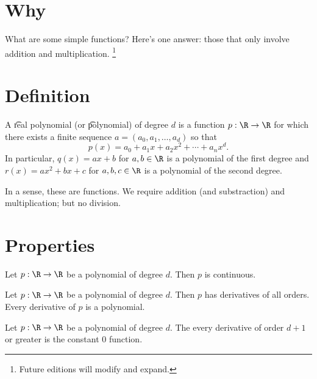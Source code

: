 
\section*{Why}

What are some simple functions?
Here's one answer: those that only involve addition and multiplication.
    \ifhmode\unskip\fi\footnote{
Future editions will modify and expand.
    }

\section*{Definition}

A \t{real polynomial} (or \t{polynomial}) of degree $d$ is a function $p: \R  \to \R $ for which there exists a finite sequence $a = (a_0, a_1, \dots , a_d)$ so that
    \[
p(x) = a_0 + a_1 x + a_2 x^2 + \cdots + a_nx^d.
    \]
In particular, $q(x) = ax + b$ for $a, b \in \R $ is a polynomial of the first degree and $r(x) = ax^2 + bx + c$ for $a, b, c \in \R $ is a polynomial of the second degree.

In a sense, these are  functions.
We require addition (and substraction) and multiplication; but no division.

\section*{Properties}

\begin{proposition}
Let $p: \R  \to \R $ be a polynomial of degree $d$.
Then $p$ is continuous.\end{proposition}
\begin{proposition}
Let $p: \R  \to \R $ be a polynomial of degree $d$.
Then $p$ has derivatives of all orders.
Every derivative of $p$ is a polynomial.\end{proposition}
\begin{proposition}
Let $p: \R  \to \R $ be a polynomial of degree $d$.
The every derivative of order $d+1$ or greater is the constant 0 function.\end{proposition}
\blankpage